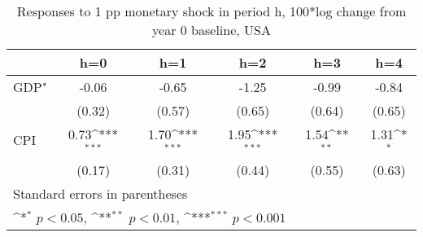 \begin{table}[htbp]\centering
\def\sym#1{\ifmmode^{#1}\else\(^{#1}\)\fi}
\caption{Responses to 1 pp monetary shock in period h, 100*log change from year 0 baseline, USA}
\begin{tabular}{l*{5}{c}}
\hline\hline
            &\multicolumn{1}{c}{h=0}&\multicolumn{1}{c}{h=1}&\multicolumn{1}{c}{h=2}&\multicolumn{1}{c}{h=3}&\multicolumn{1}{c}{h=4}\\
\hline
GDP"        &       -0.06         &       -0.65         &       -1.25         &       -0.99         &       -0.84         \\
            &      (0.32)         &      (0.57)         &      (0.65)         &      (0.64)         &      (0.65)         \\
[1em]
CPI         &        0.73\sym{***}&        1.70\sym{***}&        1.95\sym{***}&        1.54\sym{**} &        1.31\sym{*}  \\
            &      (0.17)         &      (0.31)         &      (0.44)         &      (0.55)         &      (0.63)         \\
\hline\hline
\multicolumn{6}{l}{\footnotesize Standard errors in parentheses}\\
\multicolumn{6}{l}{\footnotesize \sym{*} \(p<0.05\), \sym{**} \(p<0.01\), \sym{***} \(p<0.001\)}\\
\end{tabular}
\end{table}

